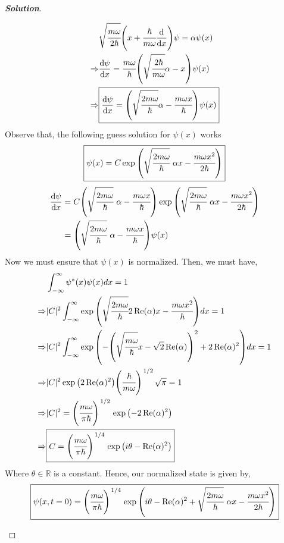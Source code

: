 \documentclass[10pt]{scrartcl}
\theoremstyle{definition}
\newenvironment{solution} {\begin{proof}[\normalfont \textbf{Solution}]} {\end{proof}}
\newcommand{\rn}{\mathbb{R}}
\begin{document}
\begin{solution}
\begin{enumerate}[label=(\alph*)]
\begin{align*}
                &\sqrt{\cfrac{m\omega}{2\hbar}}\qty(x + \cfrac{\hbar}{m\omega} \dv{x})\psi = \alpha \psi(x) \\
                \Rightarrow &\dv{\psi}{x} = \cfrac{m\omega}{\hbar}\qty(\sqrt{\cfrac{2\hbar}{m\omega}}\alpha - x)\psi(x) \\
                \Rightarrow &\boxed{\dv{\psi}{x} = \qty(\sqrt{\cfrac{2m\omega}{\hbar}}\alpha - \cfrac{m\omega x}{\hbar})\psi(x)} \\
            \end{align*}
            Observe that, the following guess solution for $\psi(x)$ works
            $$\boxed{\psi(x) = C\exp\qty(\sqrt{\cfrac{2m\omega}{\hbar}}~\alpha x - \cfrac{m\omega x^2}{2\hbar})}$$
            \begin{align*}
                \dv{\psi}{x} &= C\qty(\sqrt{\cfrac{2m\omega}{\hbar}}~\alpha - \cfrac{m\omega x}{\hbar}) \exp\qty(\sqrt{\cfrac{2m\omega}{\hbar}}~\alpha x - \cfrac{m\omega x^2}{2\hbar}) \\ 
                             &= \qty(\sqrt{\cfrac{2m\omega}{\hbar}}~\alpha - \cfrac{m\omega x}{\hbar})\psi(x)
            \end{align*}
            Now we must ensure that $\psi(x)$ is normalized. Then, we must have, 
            \begin{align*}
                &\int_{-\infty}^\infty \psi^*(x)\psi(x)dx = 1 \\ 
                \Rightarrow &|C|^2 \int_{-\infty}^\infty \exp\qty(\sqrt{\cfrac{2m\omega}{\hbar}}2\Re(\alpha)x - \cfrac{m\omega x^2}{\hbar} )dx  = 1\\ 
                \Rightarrow &|C|^2 \int_{-\infty}^\infty \exp\qty(-\qty(\sqrt{\cfrac{m\omega}{\hbar}}x - \sqrt 2\Re(\alpha))^2 + 2\Re(\alpha)^2)dx  = 1\\ 
                \Rightarrow &|C|^2 \exp\qty(2\Re(\alpha)^2) \qty(\cfrac{\hbar}{m\omega})^{\flatfrac{1}{2}} \sqrt\pi = 1 \\
                \Rightarrow &|C|^2 = \qty(\cfrac{m\omega}{\pi\hbar})^{\flatfrac{1}{2}} \exp\qty(-2\Re(\alpha)^2) \\
                \Rightarrow &\boxed{C = \qty(\cfrac{m\omega}{\pi\hbar})^{\flatfrac{1}{4}} \exp\qty(i\theta -\Re(\alpha)^2)}
            \end{align*}
            Where $\theta \in \rn$ is a constant. Hence, our normalized state is given by, 
            $$\boxed{\psi(x, t=0) = \qty(\cfrac{m\omega}{\pi\hbar})^{\flatfrac{1}{4}}\exp\qty(i\theta -\Re(\alpha)^2 + \sqrt{\cfrac{2m\omega}{\hbar}}~\alpha x - \cfrac{m\omega x^2}{2\hbar})}$$
    \end{enumerate}
\end{solution}
\end{document}
